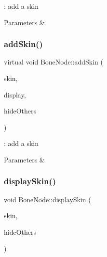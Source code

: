 \+: add a skin 


\begin{DoxyParams}{Parameters}
{\em } & \\
\hline
\end{DoxyParams}
\mbox{\label{classBoneNode_aff3f3c37ed61f70254c8cca84042fc95}} 
\subsubsection{\texorpdfstring{add\+Skin()}{addSkin()}\hspace{0.1cm}{\footnotesize\ttfamily [4/4]}}
{\footnotesize\ttfamily virtual void Bone\+Node\+::add\+Skin (\begin{DoxyParamCaption}\item[{Skin\+Node $\ast$}]{skin,  }\item[{bool}]{display,  }\item[{bool}]{hide\+Others }\end{DoxyParamCaption})\hspace{0.3cm}{\ttfamily [virtual]}}



\+: add a skin 


\begin{DoxyParams}{Parameters}
{\em } & \\
\hline
\end{DoxyParams}
\mbox{\label{classBoneNode_a7de62b37d7028948f09435c839ab3d9b}} 
\subsubsection{\texorpdfstring{display\+Skin()}{displaySkin()}\hspace{0.1cm}{\footnotesize\ttfamily [1/4]}}
{\footnotesize\ttfamily void Bone\+Node\+::display\+Skin (\begin{DoxyParamCaption}\item[{Skin\+Node $\ast$}]{skin,  }\item[{bool}]{hide\+Others }\end{DoxyParamCaption})\hspace{0.3cm}{\ttfamily [virtual]}}



